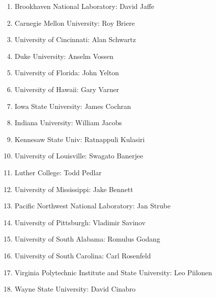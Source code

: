 \begin{enumerate}
\item Brookhaven National Laboratory: David Jaffe
\item Carnegie Mellon University: Roy Briere
\item University of Cincinnati: Alan Schwartz
\item Duke University: Anselm Vossen
\item University of Florida: John Yelton
\item University of Hawaii: Gary  Varner
\item Iowa State University: James Cochran
\item Indiana University: William Jacobs
\item Kennesaw State Univ: Ratnappuli  Kulasiri
\item University of Louisville: Swagato Banerjee
\item Luther College: Todd Pedlar
\item University of Mississippi: Jake Bennett
\item Pacific Northwest National Laboratory: Jan  Strube
\item University of Pittsburgh: Vladimir Savinov
\item University of South Alabama: Romulus Godang
\item University of South Carolina: Carl Rosenfeld
\item Virginia Polytechnic Institute and State University: Leo Piilonen
\item Wayne State University: David Cinabro
\end{enumerate}
